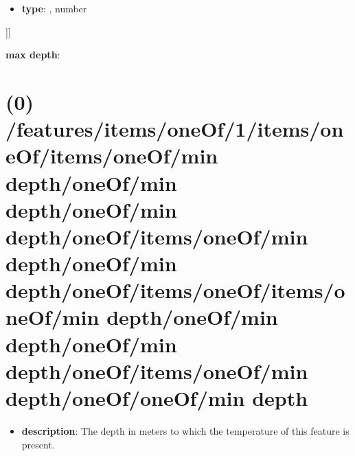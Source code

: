 \begin{itemize}[leftmargin=5em]\item {\bf type}: , number\end{itemize}]]\item {\bf max depth}: \section{(0) /features/items/oneOf/1/items/oneOf/items/oneOf/min depth/oneOf/min depth/oneOf/min depth/oneOf/items/oneOf/min depth/oneOf/min depth/oneOf/items/oneOf/items/oneOf/min depth/oneOf/min depth/oneOf/min depth/oneOf/items/oneOf/min depth/oneOf/oneOf/min depth}
\begin{itemize}[leftmargin=0em]\item {\bf description}: The depth in meters to which the temperature of this feature is present.
\end{itemize}
